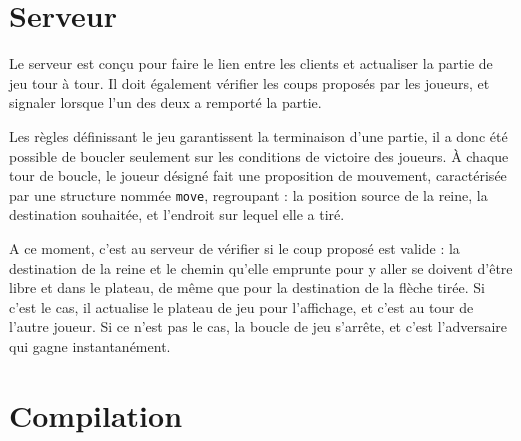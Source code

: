\section{Serveur}

Le serveur est conçu pour faire le lien entre les clients et actualiser la partie de jeu tour à tour. Il doit également vérifier les coups proposés par les joueurs, et signaler lorsque l'un des deux a remporté la partie.

\medbreak

Les règles définissant le jeu garantissent la terminaison d'une partie, il a donc été possible de boucler seulement sur les conditions de victoire des joueurs. À chaque tour de boucle, le joueur désigné fait une proposition de mouvement, caractérisée par une structure nommée \texttt{move}, regroupant : la position source de la reine, la destination souhaitée, et l'endroit sur lequel elle a tiré.

\medbreak

A ce moment, c'est au serveur de vérifier si le coup proposé est valide : la destination de la reine et le chemin qu'elle emprunte pour y aller se doivent d'être libre et dans le plateau, de même que pour la destination de la flèche tirée. Si c'est le cas, il actualise le plateau de jeu pour l'affichage, et c'est au tour de l'autre joueur. Si ce n'est pas le cas, la boucle de jeu s'arrête, et c'est l'adversaire qui gagne instantanément.  




\section{Compilation}

